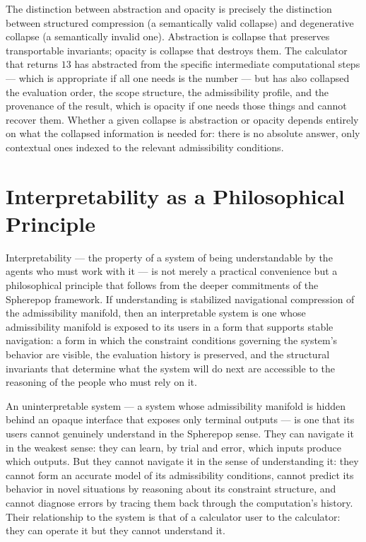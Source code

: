 \documentclass[12pt,openany]{book}
\theoremstyle{plain}
\theoremstyle{definition}
\theoremstyle{remark}
\begin{document}
The distinction between abstraction and opacity is precisely the distinction between structured compression (a semantically valid collapse) and degenerative collapse (a semantically invalid one). Abstraction is collapse that preserves transportable invariants; opacity is collapse that destroys them. The calculator that returns $13$ has abstracted from the specific intermediate computational steps — which is appropriate if all one needs is the number — but has also collapsed the evaluation order, the scope structure, the admissibility profile, and the provenance of the result, which is opacity if one needs those things and cannot recover them. Whether a given collapse is abstraction or opacity depends entirely on what the collapsed information is needed for: there is no absolute answer, only contextual ones indexed to the relevant admissibility conditions.

\section{Interpretability as a Philosophical Principle}

Interpretability — the property of a system of being understandable by the agents who must work with it — is not merely a practical convenience but a philosophical principle that follows from the deeper commitments of the Spherepop framework. If understanding is stabilized navigational compression of the admissibility manifold, then an interpretable system is one whose admissibility manifold is exposed to its users in a form that supports stable navigation: a form in which the constraint conditions governing the system's behavior are visible, the evaluation history is preserved, and the structural invariants that determine what the system will do next are accessible to the reasoning of the people who must rely on it.

An uninterpretable system — a system whose admissibility manifold is hidden behind an opaque interface that exposes only terminal outputs — is one that its users cannot genuinely understand in the Spherepop sense. They can navigate it in the weakest sense: they can learn, by trial and error, which inputs produce which outputs. But they cannot navigate it in the sense of understanding it: they cannot form an accurate model of its admissibility conditions, cannot predict its behavior in novel situations by reasoning about its constraint structure, and cannot diagnose errors by tracing them back through the computation's history. Their relationship to the system is that of a calculator user to the calculator: they can operate it but they cannot understand it.
\end{document}
